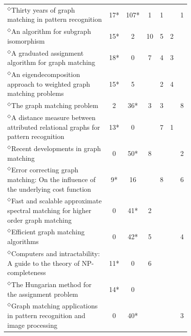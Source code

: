\documentclass[12pt]{thesis}
\theoremstyle{plain}
\theoremstyle{definition}
\theoremstyle{remark}
\begin{document}
\begin{table}[H]
\centering
\vspace{-.5cm}
{\setlength\extrarowheight{2pt}\setlength{\tabcolsep}{3pt}\fontsize{10}{13}\selectfont
\begin{tabular}{|L{0.75\linewidth}|c|c|c|c|c|c|}
\hline
&  &   &  &   &   &  \\ 
\hline\hline
$^\Diamond$Thirty years of graph matching in pattern recognition  \cite{Conte_2004} & 17* & 107* & 1 & 1 &  & 1 \\ \hline
$^\Diamond$An algorithm for subgraph isomorphism  \cite{Ullmann_1976} & 15* & 2 & 10 & 5 & 2 &  \\ \hline
$^\Diamond$A graduated assignment algorithm for graph matching  \cite{Gold_1996} & 18* & 0 & 7 & 4 & 3 &  \\ \hline
$^\Diamond$An eigendecomposition approach to weighted graph matching problems  \cite{Umeyama_1988} & 15* & 5 &  & 2 & 4 &  \\ \hline
$^\Diamond$The graph matching problem  \cite{Livi_2012} & 2 & 36* & 3 & 3 &  & 8 \\ \hline
$^\Diamond$A distance measure between attributed relational graphs for pattern recognition  \cite{Sanfeliu_1983} & 13* & 0 &  & 7 & 1 &  \\ \hline
$^\Diamond$Recent developments in graph matching  \cite{Bunke_2000} & 0 & 50* & 8 &  &  & 2 \\ \hline
$^\Diamond$Error correcting graph matching: On the influence of the underlying cost function  \cite{Bunke_1999} & 9* & 16 &  & 8 &  & 6 \\ \hline
$^\Diamond$Fast and scalable approximate spectral matching for higher order graph matching  \cite{Park_2014} & 0 & 41* & 2 &  &  &  \\ \hline
$^\Diamond$Efficient graph matching algorithms  \cite{Messmer_1995} & 0 & 42* & 5 &  &  & 4 \\ \hline
$^\Diamond$Computers and intractability: A guide to the theory of NP-completeness  \cite{Hartmanis_1982} & 11* & 0 & 6 &  &  &  \\ \hline
$^\Diamond$The Hungarian method for the assignment problem  \cite{Kuhn_1955} & 14* & 0 &  &  &  &  \\ \hline
$^\Diamond$Graph matching applications in pattern recognition and image processing  \cite{Conte_2003} & 0 & 40* &  &  &  & 3 \\ \hline

\end{tabular}}
\end{table}
\end{document}
